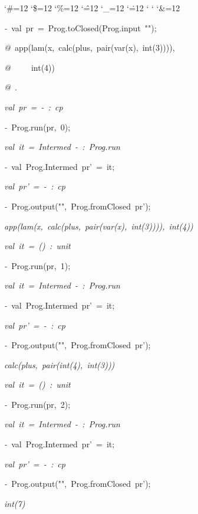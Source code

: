 \begin{list}{}
{\setlength{\leftmargin}{\leftmargini}
\setlength{\rightmargin}{0cm}
\setlength{\itemindent}{0cm}
\setlength{\listparindent}{0cm}
\setlength{\itemsep}{0cm}
\setlength{\parsep}{0cm}
\setlength{\labelsep}{0cm}
\setlength{\labelwidth}{0cm}
\catcode`\#=12
\catcode`\$=12
\catcode`\%=12
\catcode`\^=12
\catcode`\_=12
\catcode`\.=12
\catcode`
\catcode`
\catcode`\&=12
\ttfamily}
\small
\item[]\textsl{-\ }val\ pr\ =\ Prog.toClosed(Prog.input\ "");
\item[]\textsl{@\ }app(lam(x,\ calc(plus,\ pair(var(x),\ int(3)))),
\item[]\textsl{@\ }\ \ \ \ int(4))
\item[]\textsl{@\ }.
\item[]\textsl{val\ pr\ =\ -\ :\ cp}
\item[]\textsl{-\ }Prog.run(pr,\ 0);
\item[]\textsl{val\ it\ =\ Intermed\ -\ :\ Prog.run}
\item[]\textsl{-\ }val\ Prog.Intermed\ pr'\ =\ it;
\item[]\textsl{val\ pr'\ =\ -\ :\ cp}
\item[]\textsl{-\ }Prog.output("",\ Prog.fromClosed\ pr');
\item[]\textsl{app(lam(x,\ calc(plus,\ pair(var(x),\ int(3)))),\ int(4))}
\item[]\textsl{val\ it\ =\ ()\ :\ unit}
\item[]\textsl{-\ }Prog.run(pr,\ 1);
\item[]\textsl{val\ it\ =\ Intermed\ -\ :\ Prog.run}
\item[]\textsl{-\ }val\ Prog.Intermed\ pr'\ =\ it;
\item[]\textsl{val\ pr'\ =\ -\ :\ cp}
\item[]\textsl{-\ }Prog.output("",\ Prog.fromClosed\ pr');
\item[]\textsl{calc(plus,\ pair(int(4),\ int(3)))}
\item[]\textsl{val\ it\ =\ ()\ :\ unit}
\item[]\textsl{-\ }Prog.run(pr,\ 2);
\item[]\textsl{val\ it\ =\ Intermed\ -\ :\ Prog.run}
\item[]\textsl{-\ }val\ Prog.Intermed\ pr'\ =\ it;
\item[]\textsl{val\ pr'\ =\ -\ :\ cp}
\item[]\textsl{-\ }Prog.output("",\ Prog.fromClosed\ pr');
\item[]\textsl{int(7)}

\end{list}
